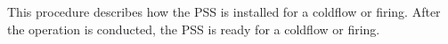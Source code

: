 This procedure describes how the PSS is installed for a coldflow or firing. After the operation is conducted, the PSS is ready for a coldflow or firing. 